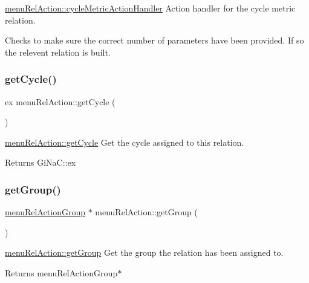 \mbox{\hyperlink{classmenu_rel_action_adbd43b99466f9ad2cde1934e1599ae4c}{menu\+Rel\+Action\+::cycle\+Metric\+Action\+Handler}} Action handler for the cycle metric relation. 

Checks to make sure the correct number of parameters have been provided. If so the relevent relation is built. \mbox{\label{classmenu_rel_action_acb80ac433c901f22dbddcff7445adf24}} 
\subsubsection{\texorpdfstring{get\+Cycle()}{getCycle()}}
{\footnotesize\ttfamily ex menu\+Rel\+Action\+::get\+Cycle (\begin{DoxyParamCaption}{ }\end{DoxyParamCaption})}



\mbox{\hyperlink{classmenu_rel_action_acb80ac433c901f22dbddcff7445adf24}{menu\+Rel\+Action\+::get\+Cycle}} Get the cycle assigned to this relation. 

\begin{DoxyReturn}{Returns}
Gi\+Na\+C\+::ex 
\end{DoxyReturn}
\mbox{\label{classmenu_rel_action_aca0baeed9c6a266d677dae8dfb25d65b}} 
\subsubsection{\texorpdfstring{get\+Group()}{getGroup()}}
{\footnotesize\ttfamily \mbox{\hyperlink{classmenu_rel_action_group}{menu\+Rel\+Action\+Group}} $\ast$ menu\+Rel\+Action\+::get\+Group (\begin{DoxyParamCaption}{ }\end{DoxyParamCaption})}



\mbox{\hyperlink{classmenu_rel_action_aca0baeed9c6a266d677dae8dfb25d65b}{menu\+Rel\+Action\+::get\+Group}} Get the group the relation has been assigned to. 

\begin{DoxyReturn}{Returns}
menu\+Rel\+Action\+Group$\ast$ 
\end{DoxyReturn}
\mbox{\label{classmenu_rel_action_a8ec0134231f519695901fa4d750fab4a}} 
